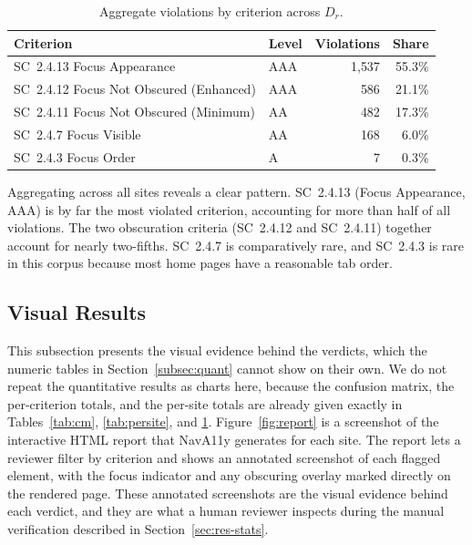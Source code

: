 \begin{table}[ht]
  \centering
  \caption{Aggregate violations by criterion across $D_r$.}
  \label{tab:aggsc}
  \begin{tabular}{llrr}
    \toprule
    Criterion & Level & Violations & Share \\
    \midrule
    SC~2.4.13 Focus Appearance              & AAA & 1{,}537 & 55.3\% \\
    SC~2.4.12 Focus Not Obscured (Enhanced) & AAA & 586     & 21.1\% \\
    SC~2.4.11 Focus Not Obscured (Minimum)  & AA  & 482     & 17.3\% \\
    SC~2.4.7 Focus Visible                  & AA  & 168     & 6.0\%  \\
    SC~2.4.3 Focus Order                    & A   & 7       & 0.3\%  \\
    \bottomrule
  \end{tabular}
\end{table}

Aggregating across all sites reveals a clear pattern. SC~2.4.13 (Focus Appearance, AAA) is
by far the most violated criterion, accounting for more than half of all violations. The
two obscuration criteria (SC~2.4.12 and SC~2.4.11) together account for nearly two-fifths.
SC~2.4.7 is comparatively rare, and SC~2.4.3 is rare in this corpus because most home pages
have a reasonable tab order.

\subsection{Visual Results}
\label{subsec:visual}
This subsection presents the visual evidence behind the verdicts, which the numeric tables
in Section~\ref{subsec:quant} cannot show on their own. We do not repeat the quantitative
results as charts here, because the confusion matrix, the per-criterion totals, and the
per-site totals are already given exactly in Tables~\ref{tab:cm}, \ref{tab:persite}, and
\ref{tab:aggsc}. Figure~\ref{fig:report} is a screenshot of the interactive HTML report
that NavA11y generates for each site. The report lets a reviewer filter by criterion and
shows an annotated screenshot of each flagged element, with the focus indicator and any
obscuring overlay marked directly on the rendered page. These annotated screenshots are the
visual evidence behind each verdict, and they are what a human reviewer inspects during the
manual verification described in Section~\ref{sec:res-stats}.


